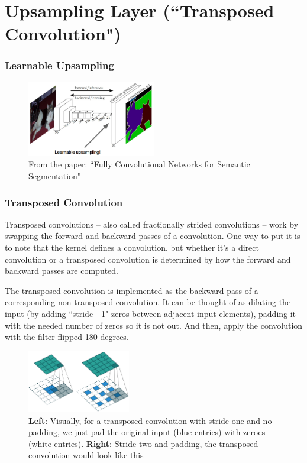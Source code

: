\chapter{Upsampling Layer (``Transposed Convolution")}
\subsection*{Learnable Upsampling}

\begin{figure}[h]
  \centering
  \includegraphics[width=0.5\textwidth]{Images/upsampling_layer/1.png}
  \caption{From the paper: ``Fully Convolutional Networks for Semantic Segmentation"}
\end{figure}



\subsection*{Transposed Convolution}
Transposed convolutions -- also called fractionally strided convolutions -- work by swapping the forward and backward passes of a convolution. One way to put it is to note that the kernel defines a convolution, but whether it’s a direct convolution or a transposed convolution is determined by how the forward and backward passes are computed.

The transposed convolution is implemented as the backward pass of a  corresponding non-transposed convolution. It can be thought of as dilating  the input (by adding ``stride - 1" zeros between adjacent input elements),  padding it with the needed number of zeros so it is not out. And then, apply the convolution with the filter flipped 180 degrees.

\begin{figure}[h]
  \centering
  \includegraphics[width=0.4\textwidth]{Images/upsampling_layer/5.png}
  \caption{\textbf{Left}: Visually, for a transposed convolution with stride one and no padding, we just pad the original input (blue entries) with zeroes (white entries). \textbf{Right}: Stride two and padding, the transposed convolution would look like this
}
\end{figure}

